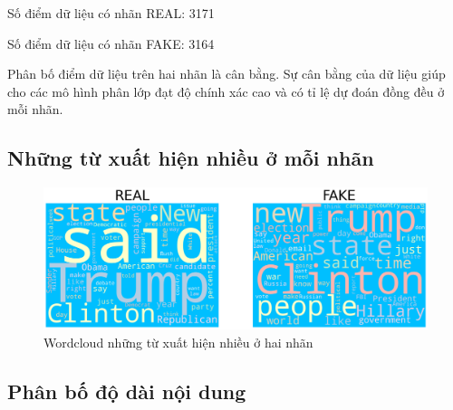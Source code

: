 \documentclass[12pt,a4paper,oneside]{book}
\begin{document}
	Số điểm dữ liệu có nhãn REAL: 3171
	
	Số điểm dữ liệu có nhãn FAKE: 3164
	
	Phân bố điểm dữ liệu trên hai nhãn là cân bằng. Sự cân bằng của dữ liệu giúp cho các mô hình phân lớp đạt độ chính xác cao và có tỉ lệ dự đoán đồng đều ở mỗi nhãn.

		\subsection{Những từ xuất hiện nhiều ở mỗi nhãn}
					\begin{figure}[H]
						\begin{center}
							\includegraphics[width=0.9\columnwidth]{wordcloud}
						\end{center}
						\caption{Wordcloud những từ xuất hiện nhiều ở hai nhãn}
					\end{figure}
	
	\subsection{Phân bố độ dài nội dung}
	
	
	
\end{document}

